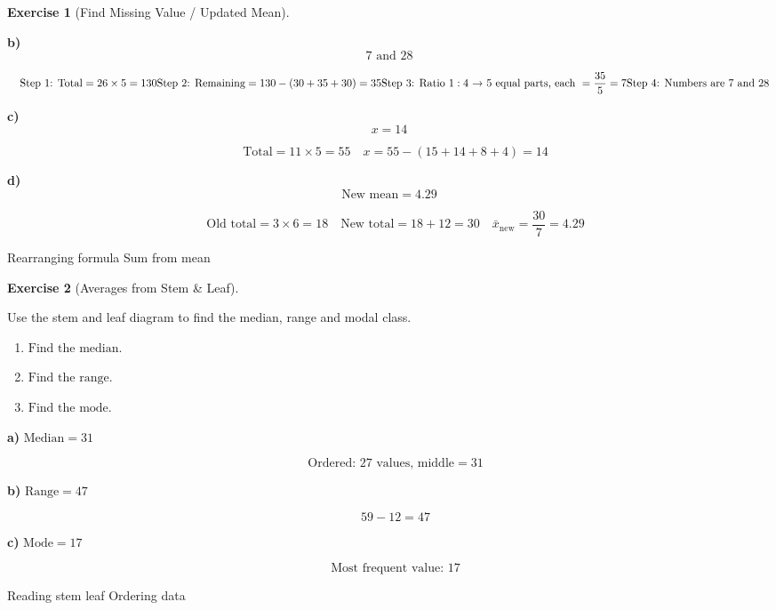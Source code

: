 \documentclass[
  letterpaper,
  DIV=11,
  numbers=noendperiod]{scrreprt}
\theoremstyle{definition}
\newtheorem{exercise}{Exercise}[chapter]
\theoremstyle{remark}
\begin{document}
\begin{exercise}[Find Missing Value / Updated
Mean]
\begin{tcolorbox}
\textbf{b)} \[7\text{ and }28\]

\[\quad \text{Step 1: Total}=26\times5=130\\[4pt]\text{Step 2: Remaining}=130-(30+35+30)=35\\[4pt]\text{Step 3: Ratio }1:4\text{ → }5\text{ equal parts, each }=\frac{35}{5}=7\\[4pt]\text{Step 4: Numbers are }7\text{ and }28\]

\textbf{c)} \[x = 14\]

\[\quad \text{Total} = 11\times5=55\quad x = 55-(15+14+8+4) = 14\]

\textbf{d)} \[\text{New mean} = 4.29\]

\[\quad \text{Old total} = 3\times6 = 18\quad \text{New total} = 18+12 = 30\quad \bar{x}_{\text{new}} = \frac{30}{7} = 4.29\]

\end{tcolorbox}

{Rearranging formula} {Sum from mean}

\end{exercise}

\begin{exercise}[Averages from Stem \&
Leaf]\protect\hypertarget{exr-avg-1}{}\label{exr-avg-1}

Use the stem and leaf diagram to find the median, range and modal class.

\begin{enumerate}
\def\labelenumi{\alph{enumi})}
\item
  \(\text{Find the median.}\)
\item
  \(\text{Find the range.}\)
\item
  \(\text{Find the mode.}\)
\end{enumerate}

\begin{tcolorbox}[enhanced jigsaw, opacitybacktitle=0.6, coltitle=black, arc=.35mm, colframe=quarto-callout-tip-color-frame, colback=white, bottomrule=.15mm, left=2mm, colbacktitle=quarto-callout-tip-color!10!white, titlerule=0mm, opacityback=0, title=\textcolor{quarto-callout-tip-color}{\faLightbulb}\hspace{0.5em}{🔍 View Solution}, leftrule=.75mm, breakable, rightrule=.15mm, bottomtitle=1mm, toptitle=1mm, toprule=.15mm]

\textbf{a)} \(\text{Median} = 31\)

\[\quad \text{Ordered: }27\text{ values, middle} = 31\]

\textbf{b)} \(\text{Range} = 47\)

\[\quad 59 - 12 = 47\]

\textbf{c)} \(\text{Mode} = 17\)

\[\quad \text{Most frequent value: }17\]

\end{tcolorbox}

{Reading stem leaf} {Ordering data}

\end{exercise}
\end{document}

